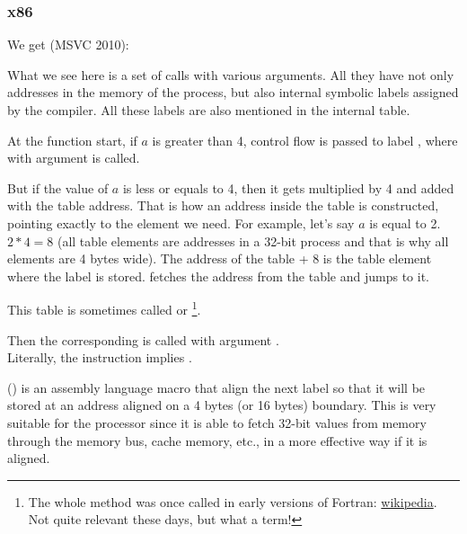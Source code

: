 \subsubsection{x86}


We get (MSVC 2010):




What we see here is a set of \printf calls with various arguments. 
All they have not only addresses in the memory of the process, but also internal symbolic labels assigned 
by the compiler. 
All these labels are also mentioned in the  internal table.

At the function start, if $a$ is greater than 4, control flow is passed to label 
, where \printf with argument  is called.

But if the value of $a$ is less or equals to 4, then it gets multiplied by 4 and added with the  
table address. That is how an address inside the table is constructed, pointing exactly to the 
element we need. For example, let's say $a$ is equal to 2. $2*4 = 8$ (all table elements 
are addresses in a 32-bit process and that is why all elements are 4 bytes wide). 
The address of the  table + 8 is the table element where the  label is stored.
\JMP fetches the  address from the table and jumps to it.

This table is sometimes called  or \footnote{The whole method was once called 
 in early versions of Fortran:
\href{http://go.yurichev.com/17122}{wikipedia}.
Not quite relevant these days, but what a term!}.

Then the corresponding \printf is called with argument .\\
Literally, the  instruction implies
 .

 () is an assembly language macro that align the next label so that it will be stored at an address aligned on a 4 bytes
(or 16 bytes) boundary.
This is very suitable for the processor since it is able to fetch 32-bit values from memory through the memory bus,
cache memory, etc., in a more effective way if it is aligned.

